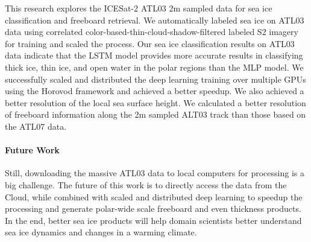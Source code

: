 This research explores the ICESat-2 ATL03 2m sampled data for sea ice classification and freeboard retrieval. We automatically labeled sea ice on ATL03 data using correlated color-based-thin-cloud-shadow-filtered labeled S2 imagery for training and scaled the process.
Our sea ice classification results on ATL03 data indicate that the LSTM model provides more accurate results in classifying thick ice, thin ice, and open water in the polar regions than the MLP model. We successfully scaled and distributed the deep learning training over multiple GPUs using the Horovod framework and achieved a better speedup. 
We also achieved a better resolution of the local sea surface height. We calculated a better resolution of freeboard information along the 2m sampled ALT03 track than those based on the ATL07 data.
\paragraph{Future Work}
Still, downloading the massive ATL03 data to local computers for processing is a big challenge. The future of this work is to directly access the data from the Cloud, while combined with scaled and distributed deep learning to speedup the processing and generate polar-wide scale freeboard and even thickness products. 
In the end, better sea ice products will help domain scientists better understand sea ice dynamics and changes in a warming climate.